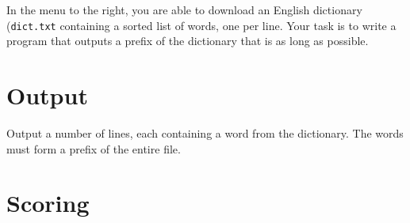 In the menu to the right, you are able to download an English dictionary (\texttt{dict.txt} containing a sorted list of words, one per line.
Your task is to write a program that outputs a prefix of the dictionary that is as long as possible.

\section*{Output}
Output a number of lines, each containing a word from the dictionary.
The words must form a prefix of the entire file.

\section*{Scoring}
